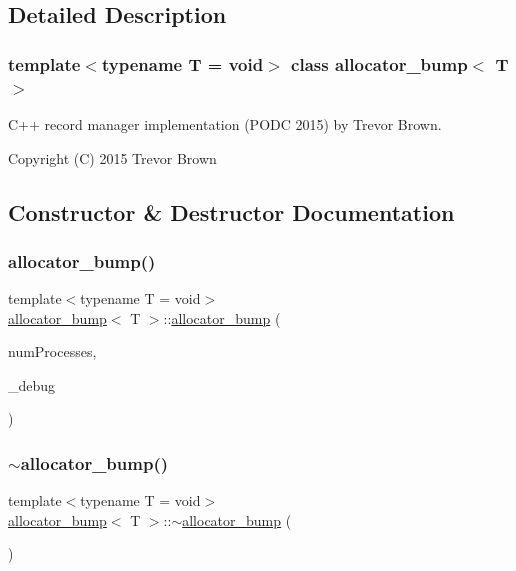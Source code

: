 \subsection{Detailed Description}
\subsubsection*{template$<$typename T = void$>$\newline
class allocator\+\_\+bump$<$ T $>$}

C++ record manager implementation (P\+O\+DC 2015) by Trevor Brown.

Copyright (C) 2015 Trevor Brown 

\subsection{Constructor \& Destructor Documentation}
\mbox{\label{classallocator__bump_a5ca967892617a91266d73adb94dd8e67}} 
\subsubsection{\texorpdfstring{allocator\+\_\+bump()}{allocator\_bump()}}
{\footnotesize\ttfamily template$<$typename T  = void$>$ \\
\hyperlink{classallocator__bump}{allocator\+\_\+bump}$<$ T $>$\+::\hyperlink{classallocator__bump}{allocator\+\_\+bump} (\begin{DoxyParamCaption}\item[{const int}]{num\+Processes,  }\item[{\hyperlink{classdebugInfo}{debug\+Info} $\ast$const}]{\+\_\+debug }\end{DoxyParamCaption})\hspace{0.3cm}{\ttfamily [inline]}}

\mbox{\label{classallocator__bump_ae5e0e9e8ffd3db2eda6dd4afe79e9425}} 
\subsubsection{\texorpdfstring{$\sim$allocator\+\_\+bump()}{~allocator\_bump()}}
{\footnotesize\ttfamily template$<$typename T  = void$>$ \\
\hyperlink{classallocator__bump}{allocator\+\_\+bump}$<$ T $>$\+::$\sim$\hyperlink{classallocator__bump}{allocator\+\_\+bump} (\begin{DoxyParamCaption}{ }\end{DoxyParamCaption})\hspace{0.3cm}{\ttfamily [inline]}}



